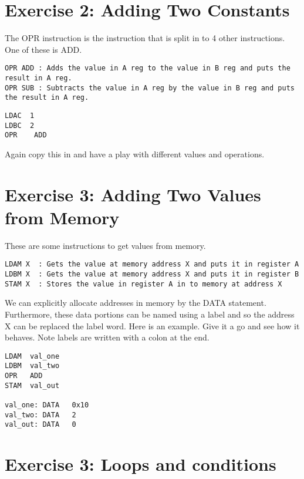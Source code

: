 \documentclass[10pt,a4paper]{article}
\begin{document}
\section{Exercise 2: Adding Two Constants}

The OPR instruction is the instruction that is split in to 4 other instructions. One of these is ADD. 

\begin{verbatim}
OPR ADD	: Adds the value in A reg to the value in B reg and puts the result in A reg.
OPR SUB	: Subtracts the value in A reg by the value in B reg and puts the result in A reg.
\end{verbatim}

\begin{lstlisting}[frame=single]
LDAC  1
LDBC  2
OPR    ADD
\end{lstlisting}

Again copy this in and have a play with different values and operations.

\section{Exercise 3: Adding Two Values from Memory}

These are some instructions to get values from memory.

\begin{verbatim}
LDAM X	: Gets the value at memory address X and puts it in register A
LDBM X 	: Gets the value at memory address X and puts it in register B
STAM X	: Stores the value in register A in to memory at address X
\end{verbatim}

We can explicitly allocate addresses in memory by the DATA statement. Furthermore, these data portions can be named using a label and so the address X can be replaced the label word. Here is an example. Give it a go and see how it behaves. Note labels are written with a colon at the end.
\\
\begin{lstlisting}[frame=single]
LDAM  val_one
LDBM  val_two
OPR   ADD
STAM  val_out

val_one: DATA   0x10
val_two: DATA   2
val_out: DATA   0
\end{lstlisting}

\section{Exercise 3: Loops and conditions}
\end{document}
